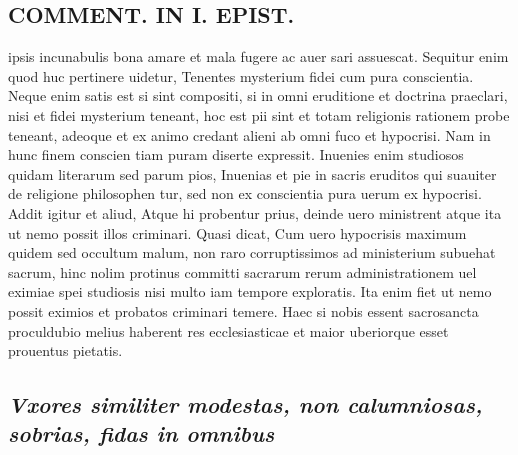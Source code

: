 \documentclass{article}
\begin{document}
\begin{pages}
\section*{COMMENT. IN I. EPIST. }\pstart ipsis incunabulis bona amare et mala fugere ac auer sari assuescat. Sequitur enim quod huc pertinere uidetur, Tenentes mysterium fidei cum pura conscientia. Neque enim satis est si sint compositi, si in omni eruditione et doctrina praeclari, nisi et fidei mysterium teneant, hoc est pii sint et totam religionis rationem probe teneant, adeoque et ex animo credant alieni ab omni fuco et hypocrisi. Nam in hunc finem conscien tiam puram diserte expressit. Inuenies enim studiosos quidam literarum sed parum pios, Inuenias et pie in sacris eruditos qui suauiter de religione philosophen tur, sed non ex conscientia pura uerum ex hypocrisi. Addit igitur et aliud, Atque hi probentur prius, deinde uero ministrent atque ita ut nemo possit illos criminari. Quasi dicat, Cum uero hypocrisis maximum quidem sed occultum malum, non raro corruptissimos ad ministerium subuehat sacrum, hinc nolim protinus committi sacrarum rerum administrationem uel eximiae spei studiosis nisi multo iam tempore exploratis. Ita enim fiet ut nemo possit eximios et probatos criminari temere. Haec si nobis essent sacrosancta proculdubio melius haberent res ecclesiasticae et maior uberiorque esset prouentus pietatis.  \pend
{}
{}
\subsection*{\textit{Vxores similiter modestas, non calumniosas, sobrias, fidas in omnibus  }}

\end{pages}
\end{document}
